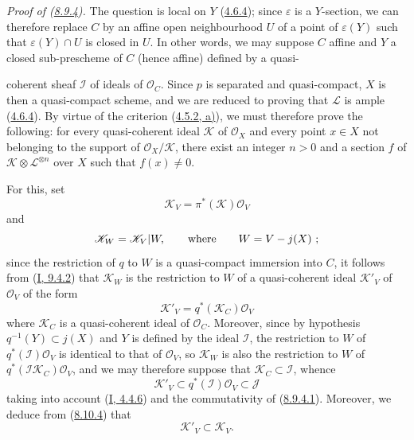\begin{env}[8.10.6]
\label{II.8.10.6}
\emph{Proof of (\hyperref[II.8.9.4]{8.9.4}).} The question is
local on $Y$ (\hyperref[II.4.6.4]{4.6.4}); since $\varepsilon$ is a
$Y$-section, we can therefore replace $C$ by an affine open neighbourhood $U$
of a point of $\varepsilon(Y)$ such that $\varepsilon(Y)\cap U$ is closed in
$U$. In other words, we may suppose $C$ affine and $Y$ a closed sub-prescheme
of $C$ (hence affine) defined by a quasi-

coherent sheaf $\mathcal{I}$ of ideals of $\mathcal{O}_C$. Since $p$ is
separated and quasi-compact, $X$ is then a quasi-compact scheme, and we are
reduced to proving that $\mathcal{L}$ is ample
(\hyperref[II.4.6.4]{4.6.4}). By virtue of the criterion
(\hyperref[II.4.5.2]{4.5.2, a)}), we must therefore prove the following: for
every quasi-coherent ideal $\mathcal{K}$ of $\mathcal{O}_X$ and every point
$x\in X$ not belonging to the support of $\mathcal{O}_X/\mathcal{K}$, there
exist an integer $n>0$ and a section $f$ of
$\mathcal{K}\otimes\mathcal{L}^{\otimes n}$ over $X$ such that
$f(x)\neq0$.

For this, set
\[
  \mathcal{K}_V=\pi^*(\mathcal{K})\mathcal{O}_V
\]
and
\[
  \mathcal{K}_W=\mathcal{K}_V|W,\qquad\hbox{where}\qquad W=V-j(X)~;
\]
since the restriction of $q$ to $W$ is a quasi-compact immersion into $C$,
it follows from (\hyperref[I.9.4.2]{I, 9.4.2}) that $\mathcal{K}_W$ is the
restriction to $W$ of a quasi-coherent ideal $\mathcal{K}'_V$ of
$\mathcal{O}_V$ of the form
\[
  \mathcal{K}'_V=q^*(\mathcal{K}_C)\mathcal{O}_V
\]
where $\mathcal{K}_C$ is a quasi-coherent ideal of $\mathcal{O}_C$. Moreover,
since by hypothesis $q^{-1}(Y)\subset j(X)$ and $Y$ is defined by the ideal
$\mathcal{I}$, the restriction to $W$ of $q^*(\mathcal{I})\mathcal{O}_V$ is
identical to that of $\mathcal{O}_V$, so $\mathcal{K}_W$ is also the
restriction to $W$ of $q^*(\mathcal{I}\mathcal{K}_C)\mathcal{O}_V$, and we
may therefore suppose that $\mathcal{K}_C\subset\mathcal{I}$, whence
\begin{equation}
\label{II.8.10.6.1}
  \mathcal{K}'_V\subset q^*(\mathcal{I})\mathcal{O}_V\subset\mathcal{J}
\tag{8.10.6.1}
\end{equation}
taking into account (\hyperref[I.4.4.6]{I, 4.4.6}) and the commutativity of
(\hyperref[II.8.9.4.1]{8.9.4.1}). Moreover, we deduce from
(\hyperref[II.8.10.4]{8.10.4}) that
\begin{equation}
\label{II.8.10.6.2}
  \mathcal{K}'_V\subset\mathcal{K}_V.
\tag{8.10.6.2}
\end{equation}


\end{env}
